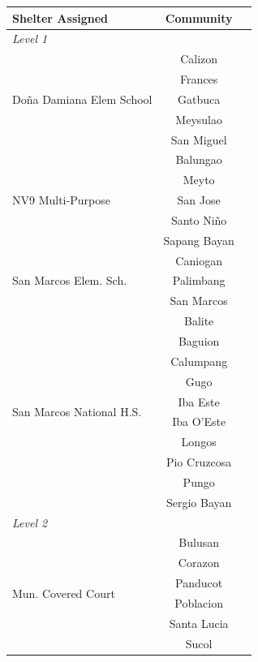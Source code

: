	\begin{table}[h!]
	    \centering
	    \renewcommand{\arraystretch}{1.2}
	    \begin{tabular}{p{12cm}cc}
	        \toprule
	        \textbf{Shelter Assigned} & \textbf{Community} \\
	        \midrule
	        \multicolumn{2}{l}{\textit{Level 1}} \\
	        \hline
	        \multirow{5}{*}{Doña Damiana Elem School} 
	            & Calizon \\
	            & Frances \\
	            & Gatbuca \\
	            & Meysulao \\
	            & San Miguel \\
	        \hline
	        \multirow{5}{*}{NV9 Multi-Purpose}
	            & Balungao \\
	            & Meyto \\
	            & San Jose \\
	            & Santo Niño \\
	            & Sapang Bayan \\
	        \hline
	        \multirow{3}{*}{San Marcos Elem. Sch.}
	            & Caniogan \\
	            & Palimbang \\
	            & San Marcos \\
	        \hline
	        \multirow{10}{*}{San Marcos National H.S.}
	            & Balite \\
	            & Baguion \\
	            & Calumpang \\
	            & Gugo \\
	            & Iba Este \\
	            & Iba O'Este \\
	            & Longos \\
	            & Pio Cruzcosa \\
	            & Pungo \\
	            & Sergio Bayan \\
	        \hline
	        \multicolumn{2}{l}{\textit{Level 2}} \\
	        \hline
	        \multirow{6}{*}{Mun. Covered Court}
	            & Bulusan \\
	            & Corazon \\
	            & Panducot \\
	            & Poblacion \\
	            & Santa Lucia \\
	            & Sucol \\
	        \bottomrule
	    \end{tabular}
	\end{table}
	
